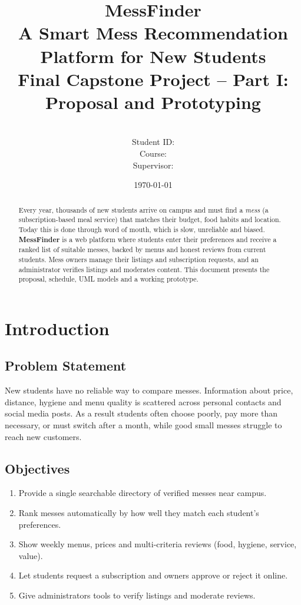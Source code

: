 \documentclass[11pt,a4paper]{article}
\title{\textbf{MessFinder}\\[2pt]\large A Smart Mess Recommendation Platform for New Students\\[4pt]\normalsize Final Capstone Project -- Part I: Proposal and Prototyping}
\author{\StudentName \\ Student ID: \StudentID \\ Course: \CourseName \\ Supervisor: \Supervisor}
\date{\today}
\begin{document}
\maketitle
\begin{abstract}
Every year, thousands of new students arrive on campus and must find a \emph{mess} (a subscription-based meal service) that matches their budget, food habits and location. Today this is done through word of mouth, which is slow, unreliable and biased. \textbf{MessFinder} is a web platform where students enter their preferences and receive a ranked list of suitable messes, backed by menus and honest reviews from current students. Mess owners manage their listings and subscription requests, and an administrator verifies listings and moderates content. This document presents the proposal, schedule, UML models and a working prototype.
\end{abstract}
\tableofcontents\newpage

\section{Introduction}
\subsection{Problem Statement}
New students have no reliable way to compare messes. Information about price, distance, hygiene and menu quality is scattered across personal contacts and social media posts. As a result students often choose poorly, pay more than necessary, or must switch after a month, while good small messes struggle to reach new customers.

\subsection{Objectives}
\begin{enumerate}[nosep]
\item Provide a single searchable directory of verified messes near campus.
\item Rank messes automatically by how well they match each student's preferences.
\item Show weekly menus, prices and multi-criteria reviews (food, hygiene, service, value).
\item Let students request a subscription and owners approve or reject it online.
\item Give administrators tools to verify listings and moderate reviews.
\end{enumerate}
\end{document}
